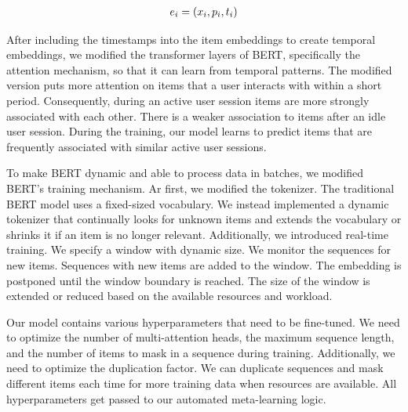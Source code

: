 \begin{equation}
\setlength{\jot}{25pt}
    \begin{aligned}
        e_i=(x_i, p_i, t_i)
    \end{aligned}
    \label{equation:modified_embedding}
\end{equation}

After including the timestamps into the item embeddings to create temporal embeddings, we modified the transformer layers of BERT, specifically the attention mechanism, so that it can learn from temporal patterns. The modified version puts more attention on items that a user interacts with within a short period. Consequently, during an active user session items are more strongly associated with each other. There is a weaker association to items after an idle user session. During the training, our model learns to predict items that are frequently associated with similar active user sessions.

To make BERT dynamic and able to process data in batches, we modified BERT's training mechanism. Ar first, we modified the tokenizer. The traditional BERT model uses a fixed-sized vocabulary. We instead implemented a dynamic tokenizer that continually looks for unknown items and extends the vocabulary or shrinks it if an item is no longer relevant. Additionally, we introduced real-time training. We specify a window with dynamic size. We monitor the sequences for new items. Sequences with new items are added to the window. The embedding is postponed until the window boundary is reached. The size of the window is extended or reduced based on the available resources and workload.

Our model contains various hyperparameters that need to be fine-tuned.
We need to optimize the number of multi-attention heads, the maximum sequence length, and the number of items to mask in a sequence during training. Additionally, we need to optimize the duplication factor. We can duplicate sequences and mask different items each time for more training data when resources are available. All hyperparameters get passed to our automated meta-learning logic. 


